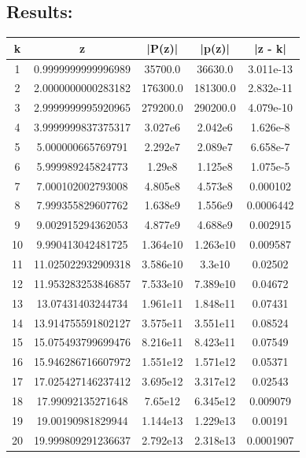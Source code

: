 \documentclass{article}
\begin{document}
\subsection*{Results:}
\begin{center}
    \begin{tabular}{| c | c | c | c | c |}
        \hline
        k & z & |P(z)| & |p(z)| & |z - k|\\
        \hline
        1 & 0.9999999999996989 & 35700.0 & 36630.0 & 3.011e-13\\
        2 & 2.0000000000283182 & 176300.0 & 181300.0 & 2.832e-11\\
        3 & 2.9999999995920965 & 279200.0 & 290200.0 & 4.079e-10\\
        4 & 3.9999999837375317 & 3.027e6 & 2.042e6 & 1.626e-8\\
        5 & 5.000000665769791 & 2.292e7 & 2.089e7 & 6.658e-7\\
        6 & 5.999989245824773 & 1.29e8 & 1.125e8 & 1.075e-5\\
        7 & 7.000102002793008 & 4.805e8 & 4.573e8 & 0.000102\\
        8 & 7.999355829607762 & 1.638e9 & 1.556e9 & 0.0006442\\
        9 & 9.002915294362053 & 4.877e9 & 4.688e9 & 0.002915\\
        10 & 9.990413042481725 & 1.364e10 & 1.263e10 & 0.009587\\
        11 & 11.025022932909318 & 3.586e10 & 3.3e10 & 0.02502\\
        12 & 11.953283253846857 & 7.533e10 & 7.389e10 & 0.04672\\
        13 & 13.07431403244734 & 1.961e11 & 1.848e11 & 0.07431\\
        14 & 13.914755591802127 & 3.575e11 & 3.551e11 & 0.08524\\
        15 & 15.075493799699476 & 8.216e11 & 8.423e11 & 0.07549\\
        16 & 15.946286716607972 & 1.551e12 & 1.571e12 & 0.05371\\
        17 & 17.025427146237412 & 3.695e12 & 3.317e12 & 0.02543\\
        18 & 17.99092135271648 & 7.65e12 & 6.345e12 & 0.009079\\
        19 & 19.00190981829944 & 1.144e13 & 1.229e13 & 0.00191\\
        20 & 19.999809291236637 & 2.792e13 & 2.318e13 & 0.0001907\\
        \hline
    \end{tabular}
    \end{center}
\end{document}
